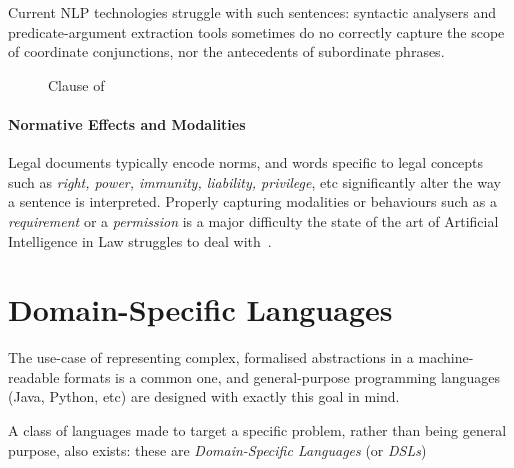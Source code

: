 Current NLP technologies struggle with such sentences: syntactic analysers and predicate-argument extraction tools sometimes do no correctly capture the scope of coordinate conjunctions, nor the antecedents of subordinate phrases.

\begin{figure}[h]
    \centering
    \caption{Clause  of~~\cite{seismicDataLicence}}
    \label{fig:geophys-long-clause}
\end{figure}

\paragraph{Normative Effects and Modalities}

Legal documents typically encode norms, and words specific to legal concepts such as \emph{right, power, immunity, liability, privilege}, etc significantly alter the way a sentence is interpreted.
Properly capturing modalities or behaviours such as a \emph{requirement} or a \emph{permission} is a major difficulty the state of the art of Artificial Intelligence in Law struggles to deal with~\cite{ferraroLegalNLPSSurvey}.


\section{Domain-Specific Languages}\label{sec:dsls}

The use-case of representing complex, formalised abstractions in a machine-readable formats is a common one, and general-purpose programming languages (Java, Python, etc) are designed with exactly this goal in mind.

A class of languages made to target a specific problem, rather than being general purpose, also exists: these are \emph{Domain-Specific Languages} (or \emph{DSLs})


